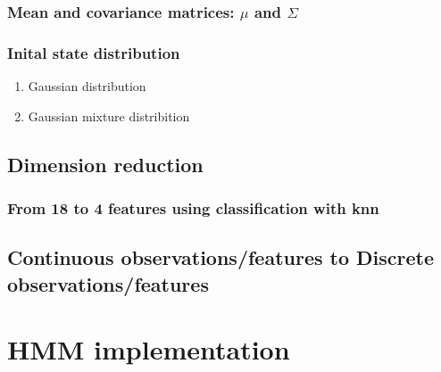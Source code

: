 \subsubsection{Mean and covariance matrices: \(\mu\) and \(\Sigma\)}

\subsubsection{Inital state distribution}
\begin{enumerate}
	\item Gaussian distribution
	\item Gaussian mixture distribition
	\end{enumerate}
\subsection{Dimension reduction}
\subsubsection{From 18 to 4 features using classification with knn}
\subsection{Continuous observations/features to Discrete observations/features}

\section{HMM implementation}